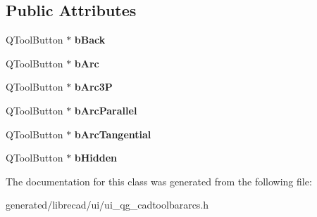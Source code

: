 \subsection*{Public Attributes}
\begin{DoxyCompactItemize}
\item 
\hypertarget{classUi__QG__CadToolBarArcs_a574d4492b5fdc0345c2b5ab0dc6ade53}{Q\-Tool\-Button $\ast$ {\bfseries b\-Back}}\label{classUi__QG__CadToolBarArcs_a574d4492b5fdc0345c2b5ab0dc6ade53}

\item 
\hypertarget{classUi__QG__CadToolBarArcs_a9dbfad1e27e0d5eb3d0bfdd99379608c}{Q\-Tool\-Button $\ast$ {\bfseries b\-Arc}}\label{classUi__QG__CadToolBarArcs_a9dbfad1e27e0d5eb3d0bfdd99379608c}

\item 
\hypertarget{classUi__QG__CadToolBarArcs_a8ca9f4ff7e7bbbc419afc6eb731c0497}{Q\-Tool\-Button $\ast$ {\bfseries b\-Arc3\-P}}\label{classUi__QG__CadToolBarArcs_a8ca9f4ff7e7bbbc419afc6eb731c0497}

\item 
\hypertarget{classUi__QG__CadToolBarArcs_a1a01a55d214652972afb56b9c46b67ee}{Q\-Tool\-Button $\ast$ {\bfseries b\-Arc\-Parallel}}\label{classUi__QG__CadToolBarArcs_a1a01a55d214652972afb56b9c46b67ee}

\item 
\hypertarget{classUi__QG__CadToolBarArcs_aec10711775553ba5965b7f6a8d168552}{Q\-Tool\-Button $\ast$ {\bfseries b\-Arc\-Tangential}}\label{classUi__QG__CadToolBarArcs_aec10711775553ba5965b7f6a8d168552}

\item 
\hypertarget{classUi__QG__CadToolBarArcs_af8ae3295b41119055a8def598123aec1}{Q\-Tool\-Button $\ast$ {\bfseries b\-Hidden}}\label{classUi__QG__CadToolBarArcs_af8ae3295b41119055a8def598123aec1}

\end{DoxyCompactItemize}


The documentation for this class was generated from the following file\-:\begin{DoxyCompactItemize}
\item 
generated/librecad/ui/ui\-\_\-qg\-\_\-cadtoolbararcs.\-h\end{DoxyCompactItemize}
